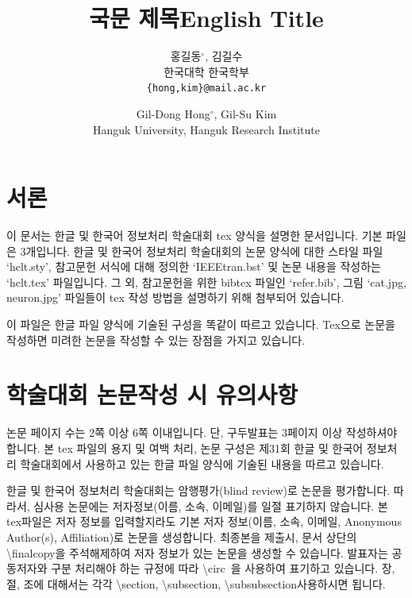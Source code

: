 \documentclass[twocolumn, 10pt]{article}
\title[korean]{국문 제목}
\title[english]{English Title}
\author[korean]{
홍길동$^{\circ}$, 김길수 \\
한국대학 한국학부\\
\texttt{\{hong,kim\}@mail.ac.kr}\\
}
\author[english]{
Gil-Dong Hong$^{\circ}$, Gil-Su Kim \\
Hanguk University, Hanguk Research Institute
}
\begin{document}

\section{서론}
이 문서는 한글 및 한국어 정보처리 학술대회 tex 양식을 설명한 문서입니다.
기본 파일은 3개입니다.
한글 및 한국어 정보처리 학술대회의 논문 양식에 대한 스타일 파일 `hclt.sty',
참고문헌 서식에 대해 정의한 `IEEEtran.bst' 및
논문 내용을 작성하는 `hclt.tex' 파일입니다.
그 외, 참고문헌을 위한 bibtex 파일인 `refer.bib', 그림 `cat.jpg, neuron.jpg' 파일들이 tex 작성 방법을 설명하기 위해 첨부되어 있습니다.

이 파일은 한글 파일 양식에 기술된 구성을 똑같이 따르고 있습니다.
Tex으로 논문을 작성하면 미려한 논문을 작성할 수 있는 장점을 가지고 있습니다.

\section{학술대회 논문작성 시 유의사항}
논문 페이지 수는 2쪽 이상 6쪽 이내입니다. 단, 구두발표는 3페이지 이상 작성하셔야 합니다. 본 tex 파일의 용지 및 여백 처리, 논문 구성은 제31회 한글 및 한국어 정보처리 학술대회에서 사용하고 있는 한글 파일 양식에 기술된 내용을 따르고 있습니다.

한글 및 한국어 정보처리 학술대회는 암행평가(blind review)로 논문을 평가합니다.
따라서, 심사용 논문에는 저자정보(이름, 소속, 이메일)를 일절 표기하지 않습니다.
본 tex파일은 저자 정보를 입력할지라도 기본 저자 정보(이름, 소속, 이메일, Anonymous Author(s), Affiliation)로 논문을 생성합니다.
최종본을 제출시, 문서 상단의 \textbackslash{finalcopy}을 주석해제하여 저자 정보가 있는 논문을 생성할 수 있습니다.
발표자는 공동저자와 구분 처리해야 하는 규정에 따라 \textbackslash{circ}~을 사용하여 표기하고 있습니다.
장, 절, 조에 대해서는 각각 \textbackslash{section}, \textbackslash{subsection}, \textbackslash{subsubsection}\을 사용하시면 됩니다.
\end{document}
